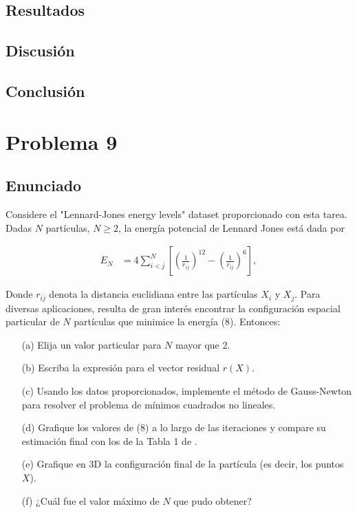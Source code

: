 \documentclass{article}
\begin{document}
\subsection{Resultados}
\setcounter{equation}{0}

\subsection{Discusión}

\subsection{Conclusión}

\section{Problema 9}

\subsection{Enunciado}

Considere el "Lennard-Jones energy levels" dataset proporcionado con esta tarea. Dadas $N$ partículas, $N \ge 2$, la energía potencial de Lennard Jones está dada por

\begin{align} \tag{8}
    E_N &= 4 \sum_{i<j}^{N} \left[ \left(\frac{1}{r_{ij}}\right)^{12} - \left(\frac{1}{r_{ij}}\right)^{6} \right],
\end{align}

Donde $r_{ij}$ denota la distancia euclidiana entre las partículas $X_i$ y $X_j$. Para diversas aplicaciones, resulta de gran interés encontrar la configuración espacial particular de $N$ partículas que minimice la energía (8). Entonces:

\begin{itemize}
    \item[(a)] Elija un valor particular para $N$ mayor que 2.
    \item[(b)] Escriba la expresión para el vector residual $r(X)$.
    \item[(c)] Usando los datos proporcionados, implemente el método de Gauss-Newton para resolver el problema de mínimos cuadrados no lineales.
    \item[(d)] Grafique los valores de (8) a lo largo de las iteraciones y compare su estimación final con los de la Tabla 1 de \cite{wales1997}.
    \item[(e)] Grafique en 3D la configuración final de la partícula (es decir, los puntos $X$).
    \item[(f)] ¿Cuál fue el valor máximo de $N$ que pudo obtener?
\end{itemize}
\end{document}
